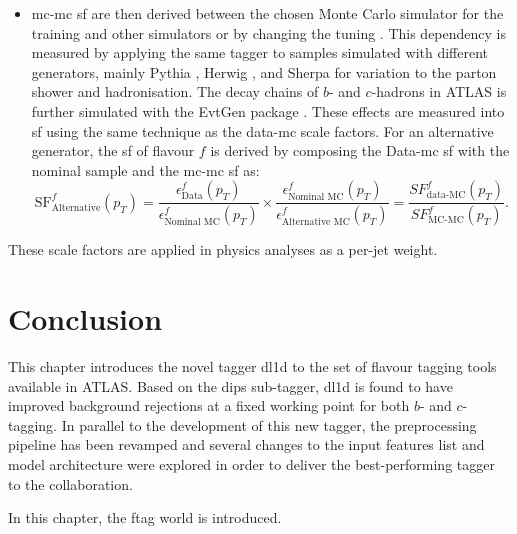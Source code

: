 \begin{itemize}
  \item \gls{mc}-\gls{mc} \gls{sf} are then derived between the chosen Monte Carlo simulator for the training and other simulators or by changing the tuning \cite{ATL-PHYS-PUB-2020-009}. This dependency is measured by applying the same tagger to samples simulated with different generators, mainly Pythia \cite{SJOSTRAND2008852}, Herwig \cite{bellm2017herwig}, and Sherpa \cite{sherpa2.2paper} for variation to the parton shower and hadronisation. The decay chains of $b$- and $c$-hadrons in ATLAS is further simulated with the EvtGen package \cite{LANGE2001152}. 
  These effects are measured into \gls{sf} using the same technique as the data-\gls{mc} scale factors. For an alternative generator, the \gls{sf} of flavour $f$ is derived by composing the Data-\gls{mc} \gls{sf} with the nominal sample and the \gls{mc}-\gls{mc} \gls{sf} as: \[\textrm{SF}^f_{\textrm{Alternative}}(p_T) = \frac{\epsilon^f_{\textrm{Data}}(p_T)}{\epsilon^f_{\textrm{Nominal MC}}(p_T)} \times \frac{\epsilon^f_{\textrm{Nominal MC}}(p_T)}{\epsilon^f_{\textrm{Alternative MC}}(p_T)} = \frac{SF^f_{\textrm{data-MC}}(p_T)}{SF^f_{\textrm{MC-MC}}(p_T)}.\] 
\end{itemize}
These scale factors are applied in physics analyses as a per-jet weight.

\section{Conclusion}
This chapter introduces the novel tagger \gls{dl1d} to the set of flavour tagging tools available in ATLAS. Based on the \gls{dips} sub-tagger, \gls{dl1d} is found to have improved background rejections at a fixed working point for both $b$- and $c$-tagging. In parallel to the development of this new tagger, the preprocessing pipeline has been revamped and several changes to the input features list and model architecture were explored in order to deliver the best-performing tagger to the collaboration. 
\clearpage


\begin{tcolorbox}[colback=oxfordblue!5,colframe=blue!40!black,title=Summary of the Chapter]
In this chapter, the \gls{ftag} world is introduced. 
\end{tcolorbox}